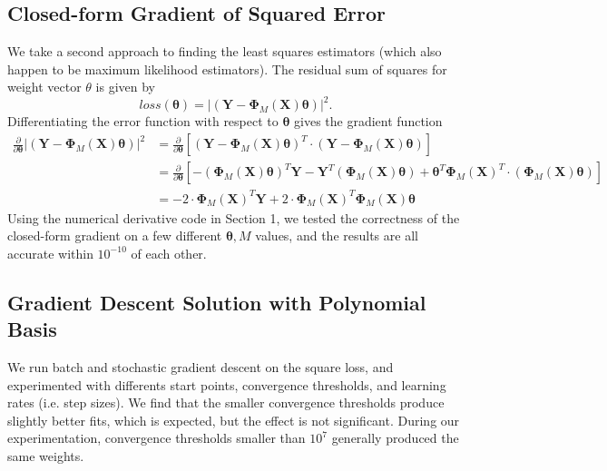 \documentclass[8pt]{article}
\begin{document}
\subsection{Closed-form Gradient of Squared Error}

We take a second approach to finding the least squares estimators (which also happen to be maximum likelihood estimators). The residual sum of squares for weight vector $\theta$ is given by
\[
loss(\bm \theta) = |(\bm Y - \bm \Phi_M(\bm X) \bm \theta)|^2.
\]
Differentiating the error function with respect to $\bm \theta$ gives the gradient function
%
 \begin{align*}
   \frac{\partial }{\partial \bm \theta} |(\bm Y - \bm \Phi_M(\bm X) \bm \theta)|^2 &= \frac{\partial }{\partial \bm \theta} [(\bm Y - \bm \Phi_M(\bm X) \bm \theta)^T \cdot (\bm Y - \bm \Phi_M(\bm X) \bm \theta)] \\
   &= \frac{\partial }{\partial \bm \theta} [- (\bm \Phi_M(\bm X) \bm \theta)^T \bm Y - \bm Y^T (\bm \Phi_M(\bm X) \bm \theta) + \bm \theta^T \bm \Phi_M(\bm X)^T \cdot (\bm \Phi_M(\bm X) \bm \theta)] \\
   &= -2  \cdot \bm \Phi_M(\bm X)^T \bm Y + 2 \cdot \bm \Phi_M(\bm X)^T \bm \Phi_M(\bm X) \bm \theta
 \end{align*}
%
Using the numerical derivative code in Section 1, we tested the correctness of the closed-form gradient on a few different $\bm \theta, M$ values, and the results are all accurate within $10^{-10}$ of each other.\footnotemark


\subsection{Gradient Descent Solution with Polynomial Basis}
We run batch and stochastic gradient descent on the square loss, and experimented with differents start points, convergence thresholds, and learning rates (i.e. step sizes). We find that the smaller convergence thresholds produce slightly better fits, which is expected, but the effect is not significant. During our experimentation, convergence thresholds smaller than $10^7$ generally produced the same weights.
\end{document}
